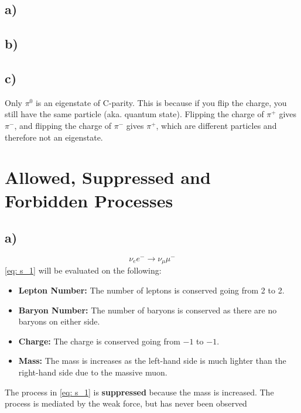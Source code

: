 \documentclass{article}
\begin{document}
\subsection*{a)}


\subsection*{b)}


\subsection*{c)}
Only $π^{0}$ is an eigenstate of C-parity. This is because if you flip the charge, you still have the same particle (aka. quantum state). Flipping the charge of $π^{+}$ gives $π^{-}$, and flipping the charge of $π^{-}$ gives $π^{+}$, which are different particles and therefore not an eigenstate. 


\section{Allowed, Suppressed and Forbidden Processes}
\subsection*{a)}
\begin{equation}\label{eq: s_1}
ν_ee^{-} → ν_{μ}μ^{-}
\end{equation}
\cref{eq: s_1} will be evaluated on the following:
\begin{itemize}
    \item \textbf{Lepton Number:} The number of leptons is conserved going from 2 to 2.  
    \item \textbf{Baryon Number:} The number of baryons is conserved as there are no baryons on either side.
    \item \textbf{Charge:} The charge is conserved going from $-1$ to $-1$. 
    \item \textbf{Mass:} The mass is increases as the left-hand side is much lighter than the right-hand side due to the massive muon. 
\end{itemize}
The process in \cref{eq: s_1} is \textbf{suppressed} because the mass is increased. The process is mediated by the weak force, but has never been observed
\end{document}
